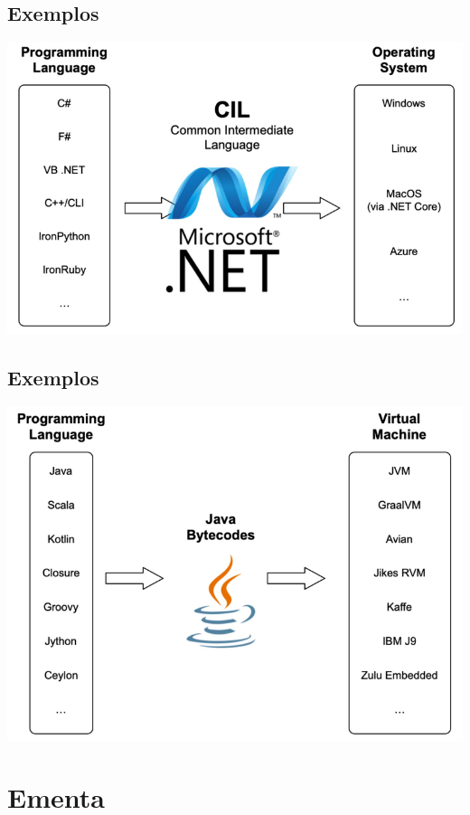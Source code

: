 \documentclass[11pt]{article}
\begin{document}
\subsection*{Exemplos}
\label{sec:org7f92bd5}

\begin{center}
\includegraphics[width=.9\linewidth]{ net.png}
\end{center}
\subsection*{Exemplos}
\label{sec:org3097ee8}

\begin{center}
\includegraphics[width=.9\linewidth]{ java.png}
\end{center}
\section*{Ementa}
\label{sec:org6a277b0}
\end{document}
